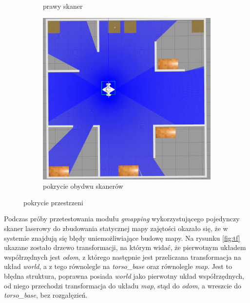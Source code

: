\begin{figure}[h!]
\begin{subfigure}[b]{0.4\linewidth}
   				 \caption{prawy skaner}
  			\end{subfigure}
			\begin{subfigure}[b]{0.9\linewidth}
    				\includegraphics[width=\linewidth]{imgs/wstepne_badania/scan_all.png}
   				 \caption{pokrycie obydwu skanerów}
  			\end{subfigure}
  			\caption{pokrycie przestrzeni}
 			 \label{fig:mapping}
		\end{figure}

	
		Podczas próby przetestowania modułu \textit{gmapping} wykorzystującego pojedynczy skaner laserowy do zbudowania statycznej mapy zajętości okazało się, że w systemie znajdują się błędy uniemożliwiające budowę mapy. 
		Na rysunku \ref{fig:tf} ukazane zostało drzewo transformacji, na którym widać, że pierwotnym układem współrzędnych jest \textit{odom}, z którego następnie jest przeliczana transformacja na układ \textit{world}, a z tego równolegle na \textit{torso\_base} oraz równolegle \textit{map}. 
		Jest to błędna struktura, poprawna posiada \textit{world} jako pierwotny układ współrzędnych, od niego przechodzi transformacja do układu \textit{map}, stąd do \textit{odom}, a wreszcie do \textit{torso\_base}, bez rozgałęzień. 
		
